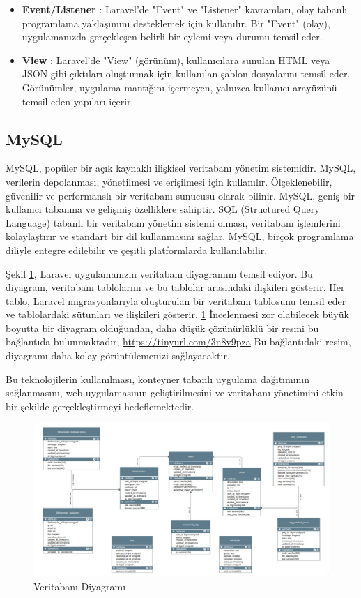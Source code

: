 \begin{itemize}
  \item \textbf{Event/Listener} : Laravel'de "Event" ve "Listener" kavramları, olay tabanlı programlama yaklaşımını desteklemek için kullanılır. Bir "Event" (olay), uygulamanızda gerçekleşen belirli bir eylemi veya durumu temsil eder.
  \item \textbf{View} : Laravel'de "View" (görünüm), kullanıcılara sunulan HTML veya JSON gibi çıktıları oluşturmak için kullanılan şablon dosyalarını temsil eder. Görünümler, uygulama mantığını içermeyen, yalnızca kullanıcı arayüzünü temsil eden yapıları içerir.
\end{itemize}
\subsection{MySQL}
MySQL, popüler bir açık kaynaklı ilişkisel veritabanı yönetim sistemidir. MySQL, verilerin depolanması, yönetilmesi ve erişilmesi için kullanılır. Ölçeklenebilir, güvenilir ve performanslı bir veritabanı sunucusu olarak bilinir. MySQL, geniş bir kullanıcı tabanına ve gelişmiş özelliklere sahiptir. SQL (Structured Query Language) tabanlı bir veritabanı yönetim sistemi olması, veritabanı işlemlerini kolaylaştırır ve standart bir dil kullanmasını sağlar. MySQL, birçok programlama diliyle entegre edilebilir ve çeşitli platformlarda kullanılabilir.

Şekil \ref{fig:veritabani_diyagrami}, Laravel uygulamanızın veritabanı diyagramını temsil ediyor. Bu diyagram, veritabanı tablolarını ve bu tablolar arasındaki ilişkileri gösterir. Her tablo, Laravel migrasyonlarıyla oluşturulan bir veritabanı tablosunu temsil eder ve tablolardaki sütunları ve ilişkileri gösterir. \ref{fig:veritabani_diyagrami} İncelenmesi zor olabilecek büyük boyutta bir diyagram olduğundan, daha düşük çözünürlüklü bir resmi bu bağlantıda bulunmaktadır, \href{https://tinyurl.com/3n8v9pza}{https://tinyurl.com/3n8v9pza} Bu bağlantıdaki resim, diyagramı daha kolay görüntülemenizi sağlayacaktır.

Bu teknolojilerin kullanılması, konteyner tabanlı uygulama dağıtımının sağlanmasını, web uygulamasının geliştirilmesini ve veritabanı yönetimini etkin bir şekilde gerçekleştirmeyi hedeflemektedir.
\begin{figure}[ht]
  \includegraphics[width=\linewidth]{images/diyagram.jpeg}
  \caption{Veritabanı Diyagramı}
  \label{fig:veritabani_diyagrami}
  \end{figure}
